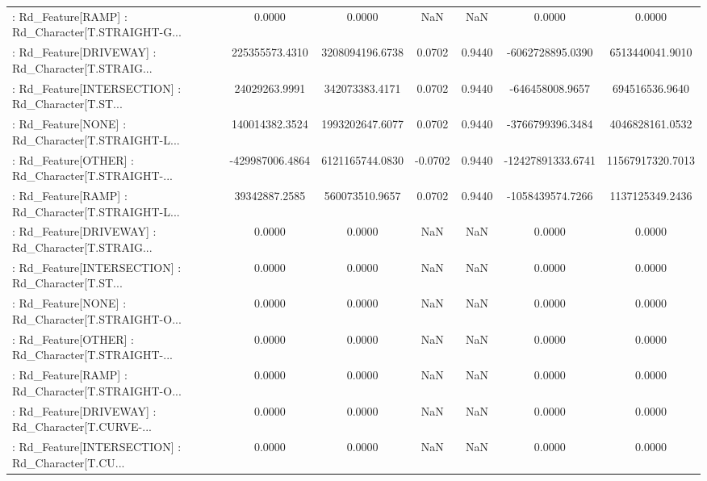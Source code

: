 \begin{longtable}{p{4cm}cccccc}
 : Rd\_Feature[RAMP] : Rd\_Character[T.STRAIGHT-G... &            0.0000 &            0.0000 &     NaN &          NaN &             0.0000 &            0.0000 \\
 : Rd\_Feature[DRIVEWAY] : Rd\_Character[T.STRAIG... &    225355573.4310 &   3208094196.6738 &  0.0702 &       0.9440 &   -6062728895.0390 &   6513440041.9010 \\
 : Rd\_Feature[INTERSECTION] : Rd\_Character[T.ST... &     24029263.9991 &    342073383.4171 &  0.0702 &       0.9440 &    -646458008.9657 &    694516536.9640 \\
 : Rd\_Feature[NONE] : Rd\_Character[T.STRAIGHT-L... &    140014382.3524 &   1993202647.6077 &  0.0702 &       0.9440 &   -3766799396.3484 &   4046828161.0532 \\
 : Rd\_Feature[OTHER] : Rd\_Character[T.STRAIGHT-... &   -429987006.4864 &   6121165744.0830 & -0.0702 &       0.9440 &  -12427891333.6741 &  11567917320.7013 \\
 : Rd\_Feature[RAMP] : Rd\_Character[T.STRAIGHT-L... &     39342887.2585 &    560073510.9657 &  0.0702 &       0.9440 &   -1058439574.7266 &   1137125349.2436 \\
 : Rd\_Feature[DRIVEWAY] : Rd\_Character[T.STRAIG... &            0.0000 &            0.0000 &     NaN &          NaN &             0.0000 &            0.0000 \\
 : Rd\_Feature[INTERSECTION] : Rd\_Character[T.ST... &            0.0000 &            0.0000 &     NaN &          NaN &             0.0000 &            0.0000 \\
 : Rd\_Feature[NONE] : Rd\_Character[T.STRAIGHT-O... &            0.0000 &            0.0000 &     NaN &          NaN &             0.0000 &            0.0000 \\
 : Rd\_Feature[OTHER] : Rd\_Character[T.STRAIGHT-... &            0.0000 &            0.0000 &     NaN &          NaN &             0.0000 &            0.0000 \\
 : Rd\_Feature[RAMP] : Rd\_Character[T.STRAIGHT-O... &            0.0000 &            0.0000 &     NaN &          NaN &             0.0000 &            0.0000 \\
 : Rd\_Feature[DRIVEWAY] : Rd\_Character[T.CURVE-... &            0.0000 &            0.0000 &     NaN &          NaN &             0.0000 &            0.0000 \\
 : Rd\_Feature[INTERSECTION] : Rd\_Character[T.CU... &            0.0000 &            0.0000 &     NaN &          NaN &             0.0000 &            0.0000 \\

\end{longtable}
